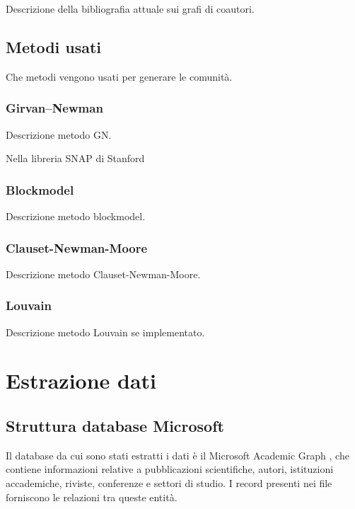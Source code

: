 \documentclass[12pt,a4paper,twoside]{report}
\begin{document}
Descrizione della bibliografia attuale sui grafi di coautori.

\section{Metodi usati} \label{sec:metodi}
Che metodi vengono usati per generare le comunità.

\subsection{Girvan–Newman} \label{subsec:gn}
Descrizione metodo GN.

Nella libreria SNAP di Stanford \cite{snapnets}

\subsection{Blockmodel} \label{subsec:bn}
Descrizione metodo blockmodel.

\subsection{Clauset-Newman-Moore} \label{subsec:cnm}
Descrizione metodo Clauset-Newman-Moore.

\subsection{Louvain} \label{subsec:lou}
Descrizione metodo Louvain se implementato.



\whitePage
\chapter{Estrazione dati} \label{cap:estrazione}

\section{Struttura database Microsoft} \label{sec:msr}
Il database da cui sono stati estratti i dati è il Microsoft Academic Graph
\cite{Sinha:2015:OMA:2740908.2742839}, che contiene informazioni relative a pubblicazioni
scientifiche, autori, istituzioni accademiche, riviste, conferenze e settori di studio. I record
presenti nei file forniscono le relazioni tra queste entità.
\end{document}
